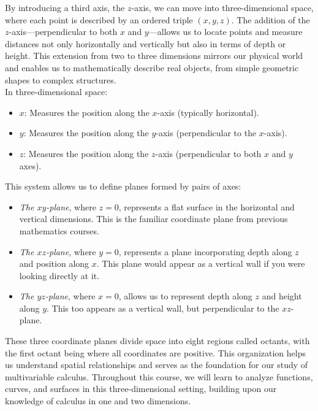 \noindent By introducing a third axis, the \( z \)-axis, we can move into three-dimensional space, where each point is described by an ordered triple \( (x, y, z) \). The addition of the \( z \)-axis—perpendicular to both \( x \) and \( y \)—allows us to locate points and measure distances not only horizontally and vertically but also in terms of depth or height. This extension from two to three dimensions mirrors our physical world and enables us to mathematically describe real objects, from simple geometric shapes to complex structures. \\ 

\noindent In three-dimensional space:
\begin{itemize}
\item \( x \): Measures the position along the \( x \)-axis (typically horizontal).
\item \( y \): Measures the position along the \( y \)-axis (perpendicular to the \( x \)-axis).
\item \( z \): Measures the position along the \( z \)-axis (perpendicular to both \( x \) and \( y \) axes).
\end{itemize}

\noindent This system allows us to define planes formed by pairs of axes:
\begin{itemize}
\item \textit{The \( xy \)-plane}, where \( z = 0 \), represents a flat surface in the horizontal and vertical dimensions. This is the familiar coordinate plane from previous mathematics courses.
\item \textit{The \( xz \)-plane}, where \( y = 0 \), represents a plane incorporating depth along \( z \) and position along \( x \). This plane would appear as a vertical wall if you were looking directly at it.
\item \textit{The \( yz \)-plane}, where \( x = 0 \), allows us to represent depth along \( z \) and height along \( y \). This too appears as a vertical wall, but perpendicular to the \( xz \)-plane.
\end{itemize}

\noindent These three coordinate planes divide space into eight regions called octants, with the first octant being where all coordinates are positive. This organization helps us understand spatial relationships and serves as the foundation for our study of multivariable calculus. Throughout this course, we will learn to analyze functions, curves, and surfaces in this three-dimensional setting, building upon our knowledge of calculus in one and two dimensions. \\


